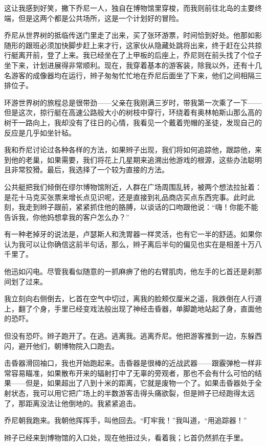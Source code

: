 \documentclass[AutoFakeBold=true]{book}
\begin{document}
这让我感到好笑，撇下乔尼一人，独自在博物馆里穿梭，而我则前往北岛的主要终端，但是这两个都是公共场所，这是一个计划好的冒险。

乔尼从世界树的抵临传送门里走了出来，买了张环游票，时间恰到好处。他那如影随形的跟班必须加快脚步赶上来才行，这家伙从隐藏处跳将出来，终于赶在公共掠行艇离开前，登了上来。我已经坐在了上甲板的后座上，乔尼则在前头找了个位子坐下来，计划进展得非常顺利。现在，我穿着基本的游客装，除我以外，还有十几名游客的成像器均在运行，辫子匆匆忙忙地在乔尼后面坐了下来，他们之间相隔三排位子。

环游世界树的旅程总是很带劲——父亲在我刚满三岁时，带我第一次乘了一下——但是这次，掠行艇在高速公路般大小的树枝中穿行，环绕着有奥林帕斯山那么高的树干一路向上，我却没有了往日的心情，我看见一个戴着兜帽的圣徒，发现自己的反应是几乎如坐针毡。

我和乔尼讨论过各种各样的方法，如果辫子出现，我们将如何追踪他，跟踪他，来到他的老巢，如果需要，我们将花上几星期来追溯出他游戏的根源，这些办法聪明且非常狡猾。最后，我选择了一个较为直接的方法。

公共艇把我们倾倒在缪尔博物馆附近，人群在广场周围乱转，被两个想法拉扯着：是花十马克买张票来增长点见识呢，还是直接到礼品商店买点东西完事。此时此刻，我走到辫子跟前，紧紧抓住他的胳膊，以谈话的口吻跟他说：``嗨！你能不能告诉我，你他妈想拿我的客户怎么办？''

有一种老掉牙的说法是，卢瑟斯人和洗胃器一样灵活，也有它一半的舒适。如果你认为我可以让你确信这前半句话，那么，辫子离后半句的偏见也实在是相差十万八千里了。

他迅如闪电。尽管我看似随意的一抓麻痹了他的右臂肌肉，他左手的匕首还是刹那间划了过来。

我立刻向右侧倒去，匕首在空气中切过，离我的脸颊仅厘米之遥，我跌倒在人行道上，翻了个身，手里已经变戏法般出现了神经击昏器，单脚跪地站起了身，直面他的恐吓。

但没有恐吓。辫子跑开了。在逃。逃离我。逃离乔尼。他把游客推到一边，东躲西闪，避开他们，朝博物院入口跑去。

击昏器滑回袖口，我也开始跑起来。击昏器是很棒的近战武器——跟霰弹枪一样非常容易瞄准，如果散布开来的辐射打中了无辜的旁观者，那也不会有什么可怕的结果——但是，如果超出了八到十米的距离，它就是废物一个了。如果击昏器处于全射状态，我可以用它把广场上的半数游客击得头痛欲裂，但是辫子已经跑得太远了，那距离没法让他倒地的。我紧紧追击。

乔尼朝我跑来。我朝他挥挥手，叫他回去。``盯牢我！''我叫道，``用追踪器！''

辫子已经来到博物馆的入口处，现在他扭过头，看着我；匕首仍然抓在手里。
\end{document}
